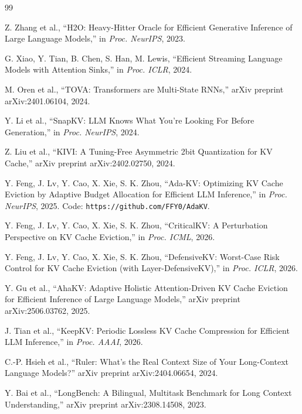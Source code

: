 \documentclass[sigconf, anonymous=false, screen=true]{acmart}
\begin{document}
\begin{thebibliography}{99}

Z. Zhang et al.,
``H2O: Heavy-Hitter Oracle for Efficient Generative Inference of Large Language Models,''
in \emph{Proc. NeurIPS}, 2023.

G. Xiao, Y. Tian, B. Chen, S. Han, M. Lewis,
``Efficient Streaming Language Models with Attention Sinks,''
in \emph{Proc. ICLR}, 2024.

M. Oren et al.,
``TOVA: Transformers are Multi-State RNNs,''
arXiv preprint arXiv:2401.06104, 2024.

Y. Li et al.,
``SnapKV: LLM Knows What You're Looking For Before Generation,''
in \emph{Proc. NeurIPS}, 2024.

Z. Liu et al.,
``KIVI: A Tuning-Free Asymmetric 2bit Quantization for KV Cache,''
arXiv preprint arXiv:2402.02750, 2024.

Y. Feng, J. Lv, Y. Cao, X. Xie, S. K. Zhou,
``Ada-KV: Optimizing KV Cache Eviction by Adaptive Budget Allocation for Efficient LLM Inference,''
in \emph{Proc. NeurIPS}, 2025. Code: \texttt{https://github.com/FFY0/AdaKV}.

Y. Feng, J. Lv, Y. Cao, X. Xie, S. K. Zhou,
``CriticalKV: A Perturbation Perspective on KV Cache Eviction,''
in \emph{Proc. ICML}, 2026.

Y. Feng, J. Lv, Y. Cao, X. Xie, S. K. Zhou,
``DefensiveKV: Worst-Case Risk Control for KV Cache Eviction (with Layer-DefensiveKV),''
in \emph{Proc. ICLR}, 2026.

Y. Gu et al.,
``AhaKV: Adaptive Holistic Attention-Driven KV Cache Eviction for Efficient Inference of Large Language Models,''
arXiv preprint arXiv:2506.03762, 2025.

J. Tian et al.,
``KeepKV: Periodic Lossless KV Cache Compression for Efficient LLM Inference,''
in \emph{Proc. AAAI}, 2026.

C.-P. Hsieh et al.,
``Ruler: What's the Real Context Size of Your Long-Context Language Models?''
arXiv preprint arXiv:2404.06654, 2024.

Y. Bai et al.,
``LongBench: A Bilingual, Multitask Benchmark for Long Context Understanding,''
arXiv preprint arXiv:2308.14508, 2023.


\end{thebibliography}
\end{document}
